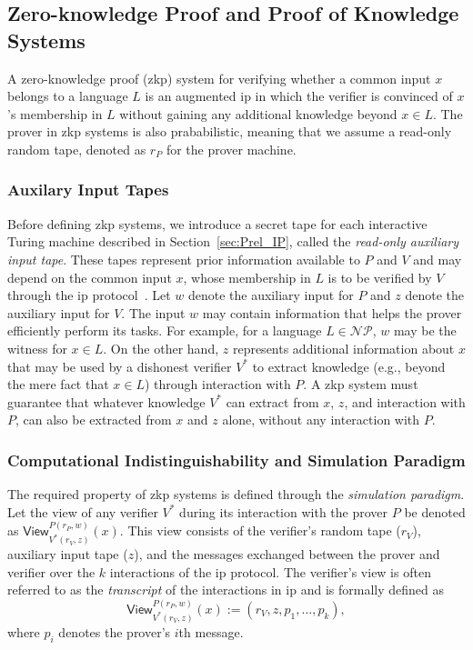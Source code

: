 \subsection{Zero-knowledge Proof and Proof of Knowledge Systems}

A zero-knowledge proof (\gls{zkp}) system for verifying whether a common input \( x \) belongs to a language \( L \) is an augmented \gls{ip} in which the verifier is convinced of \( x \)'s membership in \( L \) without gaining any additional knowledge beyond \( x \in L \). The prover in \gls{zkp} systems is also prababilistic, meaning that we assume a read-only random tape, denoted as $r_P$ for the prover machine. 

\subsubsection{Auxilary Input Tapes}
Before defining \gls{zkp} systems, we introduce a secret tape for each interactive Turing machine described in Section~\ref{sec:Prel_IP}, called the \textit{read-only auxiliary input tape}. These tapes represent prior information available to \( P \) and \( V \) and may depend on the common input \( x \), whose membership in \( L \) is to be verified by \( V \) through the \gls{ip} protocol~\cite{Goldreich2001Book}. Let \( w \) denote the auxiliary input for \( P \) and \( z \) denote the auxiliary input for \( V \). The input \( w \) may contain information that helps the prover efficiently perform its tasks. For example, for a language \( L \in \mathcal{NP} \), \( w \) may be the witness for \( x \in L \). 
On the other hand, \( z \) represents additional information about \( x \) that may be used by a dishonest verifier \( V^* \) to extract knowledge (e.g., beyond the mere fact that \( x \in L \)) through interaction with \( P \). A \gls{zkp} system must guarantee that whatever knowledge \( V^* \) can extract from \( x \), \( z \), and interaction with \( P \), can also be extracted from \( x \) and \( z \) alone, without any interaction with \( P \).  

\subsubsection{Computational Indistinguishability and Simulation Paradigm}  
The required property of \gls{zkp} systems is defined through the \textit{simulation paradigm}. Let the view of any verifier $V^*$ during its interaction with the prover $P$ be denoted as  
\(
\textsf{View}_{V^*(r_V, z)}^{P(r_P, w)}(x).
\)
This view consists of the verifier's random tape ($r_V$), auxiliary input tape ($z$), and the messages exchanged between the prover and verifier over the $k$ interactions of the \gls{ip} protocol. The verifier's view is often referred to as the \textit{transcript} of the interactions in \gls{ip} and is formally defined as  
\[
\textsf{View}_{V^*(r_V, z)}^{P(r_P, w)}(x) := (r_V, z, p_1, \dots, p_k),
\]  
where $p_i$ denotes the prover's $i$th message.


